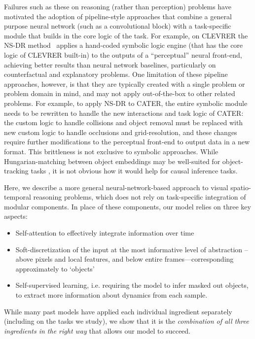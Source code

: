 \documentclass{article}
\begin{document}
Failures such as these on reasoning (rather than perception) problems have motivated the adoption of pipeline-style approaches
that combine a general purpose neural network (such as a convolutional block) with a task-specific module that builds in the core logic of the task. For example, on CLEVRER the NS-DR method~\citep{clevrer} applies a hand-coded symbolic logic engine (that has the core logic of CLEVRER built-in) to the outputs of a ``perceptual'' neural front-end, achieving better results than neural network baselines, particularly on counterfactual and explanatory problems. One limitation of these pipeline approaches, however, is that they are typically created with a single problem or problem domain in mind, and may not apply out-of-the-box to other related problems.
For example, to apply NS-DR to CATER,
the entire symbolic module needs to be rewritten to handle the new interactions and task logic of CATER:
the custom logic to handle collisions and object removal must be replaced with
new custom logic to handle occlusions and grid-resolution,
and these changes require further modifications to the perceptual front-end
to output data in a new format.
This brittleness is not exclusive to symbolic approaches. While Hungarian-matching between object embeddings may be well-suited for object-tracking tasks \citep{zhou2021hopper}, it is not obvious how it would help for
causal inference tasks.

Here, we describe a more general neural-network-based approach to visual spatio-temporal reasoning problems, which does not rely on task-specific integration of modular components. In place of these components, our model relies on three key aspects: 
\begin{itemize}[leftmargin=0.8cm]
    \item Self-attention to effectively integrate information over time
    \item Soft-discretization of the input at the most informative level of abstraction -- above pixels and local features, and below entire frames---corresponding approximately to `objects'
    \item Self-supervised learning, i.e. requiring the model to infer masked out objects, to extract more information about dynamics from each sample.
\end{itemize}
While many past models have applied each individual ingredient separately (including on the tasks we study),
we show that it is the \emph{combination of all three ingredients in the right way}
that allows our model to succeed.
\end{document}
